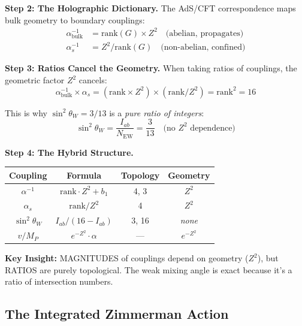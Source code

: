 \documentclass[12pt,a4paper]{article}
\newcommand{\sinW}{\sin^2\theta_W}
\newcommand{\Zsq}{Z^2}
\begin{document}
\textbf{Step 2: The Holographic Dictionary.}
The AdS/CFT correspondence maps bulk geometry to boundary couplings:
\begin{align}
\alpha^{-1}_{\text{bulk}} &= \text{rank}(G) \times \Zsq \quad
\text{(abelian, propagates)} \\
\alpha_s^{-1} &= \Zsq / \text{rank}(G) \quad
\text{(non-abelian, confined)}
\end{align}

\textbf{Step 3: Ratios Cancel the Geometry.}
When taking ratios of couplings, the geometric factor $\Zsq$ cancels:
\begin{equation}
\alpha^{-1}_{\text{bulk}} \times \alpha_s =
(\text{rank} \times \Zsq) \times (\text{rank}/\Zsq) =
\text{rank}^2 = 16
\end{equation}

This is why $\sinW = 3/13$ is a \textit{pure ratio of integers}:
\begin{equation}
\sinW = \frac{I_{ab}}{N_{\text{EW}}} = \frac{3}{13}
\quad \text{(no $\Zsq$ dependence)}
\end{equation}

\textbf{Step 4: The Hybrid Structure.}

\begin{center}
\begin{tabular}{|c|c|c|c|}
\hline
\textbf{Coupling} & \textbf{Formula} & \textbf{Topology} & \textbf{Geometry} \\
\hline
$\alpha^{-1}$ & $\text{rank} \cdot \Zsq + b_1$ & 4, 3 & $\Zsq$ \\
$\alpha_s$ & $\text{rank}/\Zsq$ & 4 & $\Zsq$ \\
$\sinW$ & $I_{ab}/(16-I_{ab})$ & 3, 16 & \textit{none} \\
$v/M_P$ & $e^{-\Zsq} \cdot \alpha$ & --- & $e^{-\Zsq}$ \\
\hline
\end{tabular}
\end{center}

\textbf{Key Insight:} MAGNITUDES of couplings depend on geometry ($\Zsq$), but RATIOS
are purely topological. The weak mixing angle is exact because it's a ratio
of intersection numbers.

\subsection{The Integrated Zimmerman Action}
\end{document}
